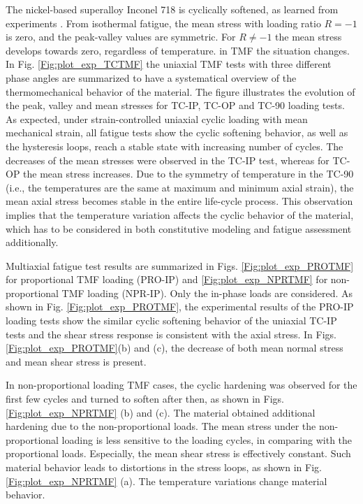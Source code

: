 \documentclass[preprint,5p,twocolumn,11pt,sort&compress]{elsarticle}
\begin{document}
The nickel-based superalloy Inconel 718 is cyclically softened, as learned from experiments \cite{Koch85, Morrow88, Socie2000}. From isothermal fatigue, the mean stress with loading ratio $R=-1$ is zero, and the peak-valley values are symmetric. For $R\ne -1$ the mean stress develops towards zero, regardless of temperature. in TMF the situation changes. In Fig. \ref{Fig:plot_exp_TCTMF} the uniaxial TMF tests with three different phase angles are summarized to have a systematical overview of the thermomechanical behavior of the material.  The figure illustrates the evolution of the peak, valley and mean stresses for TC-IP, TC-OP and TC-90 loading tests. As expected, under strain-controlled uniaxial cyclic loading with mean mechanical strain, all fatigue tests show the cyclic softening behavior, as well as the hysteresis loops, reach a stable state with increasing number of cycles. The decreases of the mean stresses were observed in the TC-IP test, whereas for TC-OP the mean stress increases. Due to the symmetry of temperature in the TC-90 (i.e., the temperatures are the same at maximum and minimum axial strain), the mean axial stress becomes stable in the entire life-cycle process. This observation implies that the temperature variation affects the cyclic behavior of the material, which has to be considered in both constitutive modeling and fatigue assessment additionally.

Multiaxial fatigue test results are summarized in Figs. \ref{Fig:plot_exp_PROTMF} for proportional TMF loading (PRO-IP) and \ref{Fig:plot_exp_NPRTMF} for non-proportional TMF loading (NPR-IP). Only the in-phase loads are considered. 
As shown in Fig. \ref{Fig:plot_exp_PROTMF}, the experimental results of the PRO-IP loading tests show the similar cyclic softening behavior of the uniaxial TC-IP tests and the shear stress response is consistent with the axial stress. In Figs. \ref{Fig:plot_exp_PROTMF}(b) and (c), the decrease of both mean normal stress and mean shear stress is present.

In non-proportional loading TMF cases, the cyclic hardening was observed for the first few cycles and turned to soften after then, as shown in Figs. \ref{Fig:plot_exp_NPRTMF} (b) and (c). The material obtained additional hardening due to the non-proportional loads. The mean stress under the non-proportional loading is less sensitive to the loading cycles, in comparing with the proportional loads. Especially, the mean shear stress is effectively constant. Such material behavior leads to distortions in the stress loops, as shown in Fig.  \ref{Fig:plot_exp_NPRTMF} (a). The temperature variations change material behavior.
\end{document}

